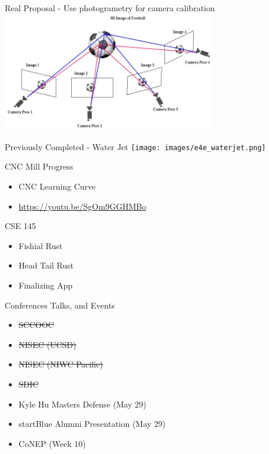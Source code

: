 \begin{frame}{Real Proposal - Use photogrametry for camera calibration}
    \centering
    \includegraphics[height=0.7\textheight,width=0.7\textwidth,keepaspectratio]{images/fishsense-photogrametry.jpg}
\end{frame}

\begin{frame}{Previously Completed - Water Jet}
    \centering
    \texttt{[image: images/e4e\_waterjet.png]}
\end{frame}

\begin{frame}{CNC Mill Progress}
    \begin{itemize}
        \item CNC Learning Curve
        \item{\url{https://youtu.be/SgOm9GGHMBo}}
    \end{itemize}
\end{frame}

\begin{frame}{CSE 145}
    \begin{itemize}
        \item Fishial Rust
        \item Head Tail Rust
        \item Finalizing App
    \end{itemize}
\end{frame}

\begin{frame}{Conferences Talks, and Events}
    \begin{itemize}
        \item \sout{SCCOOC}
        \item \sout{NISEC (UCSD)}
        \item \sout{NISEC (NIWC Pacific)}
        \item \sout{SDIC}
        \item Kyle Hu Masters Defense (May 29)
        \item startBlue Alumni Presentation (May 29)
        \item CoNEP (Week 10)
    \end{itemize}
\end{frame}
